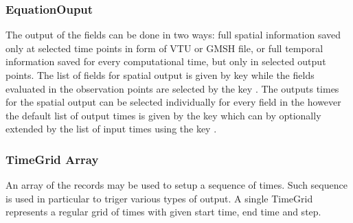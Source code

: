 \subsubsection{EquationOuput}
The output of the fields can be done in two ways: full spatial information saved only at selected time points in form of 
VTU or GMSH file, or full temporal information saved for every computational time, but only in selected output points.
The list of fields for spatial output is given by key  while the fields 
evaluated in the observation points are selected by the key .
The outputs times for the spatial output can be selected individually for every field in the 
 however the default list of output times is given by the key
 which can by optionally extended by the list of input times
using the key .

\subsubsection{TimeGrid Array}
\hypertarget{sec:TimeGrid}{}

An array of the  records may be used to setup a sequence of times. Such sequence is used in particular 
to triger various types of output. A single TimeGrid represents a regular grid of times with given start time, end time and step.
